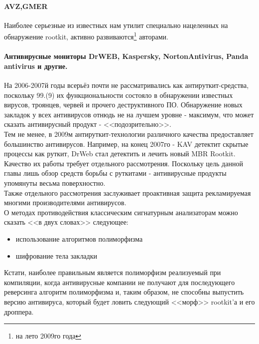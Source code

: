 \paragraph{AVZ,GMER}
\label{antirootkittool}
Наиболее серьезные из известных нам утилит специально нацеленных на обнаружение rootkit, активно развиваются\footnote{на лето 2009го года} авторами.

\paragraph{Антивирусные мониторы DrWEB, Kaspersky, NortonAntivirus, Panda antivirus и другие.\\}
\label{antiviruses}
На 2006-2007й годы всерьёз почти не рассматривались как антируткит-средства,
поскольку 99.(9) их функциональности состояло в обнаружении известных вирусов,
троянцев, червей и прочего деструктивного ПО. Обнаружение новых закладок у всех
антивирусов отнюдь не на лучшем уровне - максимум, что может сказать
антивирусный продукт - <<подозрительно>>.\\

Тем не менее, в 2009м антируткит-технологии различного качества предоставляет большинство
антивирусов. Например, на конец 2007го - KAV детектит скрытые процессы как руткит, DrWeb
стал детектить и лечить новый MBR Rootkit. Качество их работы требует отдельного рассмотрения.
Поскольку цель данной главы лишь обзор средств борьбы с руткитами - антивирусные продукты
упомянуты весьма поверхностно.\\

Также отдельного рассмотрения заслуживает проактивная защита рекламируемая многими производителями
антивирусов.\\

О методах противодействия классическим сигнатурным анализаторам можно сказать <<в двух словах>> следующее:

\begin{itemize}
\item{использование алгоритмов полиморфизма}
\item{шифрование тела закладки}
\end{itemize}

Кстати, наиболее правильным является полиморфизм реализуемый при компиляции, когда
антивирусные компании не получают для последующего реверсинга алгоритм
полиморфизма и, таким образом, не способны выпустить версию антивируса,
который будет ловить следующий <<морф>> rootkit'а и его дроппера.

